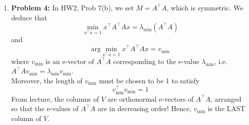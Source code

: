 \documentclass[letterpaper]{article}
\begin{document}
\begin{enumerate}
\noindent \underline{\texttt{[Q,R]=qr(A)}} in MATLAB produces
$$Q=\left[ \begin{array}{rrr}-0.169& 0.897& 0.408\\-0.507& 0.276& -0.817\\-0.845& -0.345& 0.408\end{array} \right]$$
and
$$R=\left[ \begin{array}{rr}-5.916& -7.437\\0.000&0.828\\0.000& 0.000\end{array} \right],$$
while,
\noindent \underline{\texttt{[Q,R]=qr(A,0)}}, the ``economy version'' produces
$$Q=\left[ \begin{array}{rr}-0.169& 0.897\\-0.507& 0.276\\-0.845& -0.345\end{array} \right],$$
and
$$R=\left[ \begin{array}{rr}-5.916& -7.437\\0.000& 0.828\end{array} \right].$$

\textbf{Comparison:}  The economy version of the \texttt{qr} command produces an orthonormal basis for the column span of $A$, just as we did in class. The signs of the orthonormal vectors may be different, but otherwise, the resulting factorization is identical to what we did in lecture.

The ``full'' version of the \texttt{qr} command produces an orthonormal basis for the \textit{co-domain} of $A$. Since $A$ maps $\real^2 \to \real^3$, the command \texttt{[Q,R]=qr(A)} produces an orthonormal basis for $\real^3$;  the first two columns are identical to the vectors produced by the command \texttt{[Q,R]=qr(A,0)} . The matrix $R$ has an extra row of zeros because each column of $A$ is now being expanded in terms of 3 vectors instead of 2. In general, if $A$ maps $\real^n \to \real^m$, then \texttt{[Q,R]=qr(A)} produces an orthonormal basis for $\real^m$, and then $R$ must be such that $QR=A$.



\item \noindent \textbf{Problem 4:} In HW2, Prob 7(b), we set $M=A^{\top}A$, which is symmetric. We deduce that
    $$\min_{x^\top x=1} x^\top A^\top A x = \lambda_{\min}(A^\top A)$$
and
$$\text{arg} \min_{x^\top x = 1} x^\top A^\top A x =v_{\min}$$
where $v_{\min}$ is an e-vector of $A^\top A$ corresponding to the e-value $\lambda_{\min}$, i.e. $A^\top A v_{\min} =\lambda_{\min} v_{\min}$. \\
Moreover, the length of $v_{\min}$ must be chosen to be 1 to satisfy
$$v_{\min}^{\top} v_{\min} = 1$$
From lecture, the columns of $V$ are orthonormal e-vectors of $A^\top A$, arranged so that the e-values of $A^\top A$ are in decreasing order! Hence, $v_{\min}$ is the LAST column of $V$.


\end{enumerate}
\end{document}
